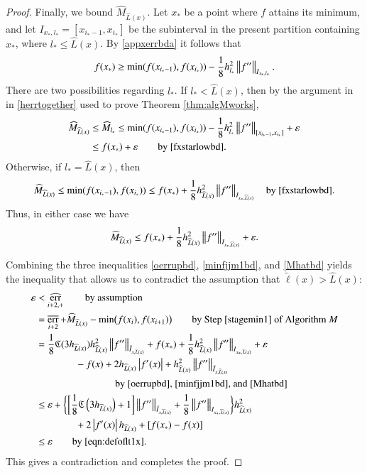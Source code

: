 \documentclass[review]{elsarticle}
\newcommand{\abstol}{\varepsilon}
\theoremstyle{definition}
\newcommand{\tell}{\tilde{\ell}}
\newcommand{\chL}{\widehat{L}}
\newcommand{\hM}{\widehat{M}}
\DeclareMathOperator{\oerr}{\overline{err}}
\DeclareMathOperator{\herr}{\widehat{err}}
\begin{document}
\begin{proof}
Finally, we bound $ \hM_{\chL(x)}$. Let $x_*$ be a point where $f$ attains its minimum,
and
let $I_{x_*,l_*} = [x_{i_*-1}, x_{i_*}]$ be the subinterval in the present partition containing
$x_*$, where $l_* \le \chL(x)$. By
\eqref{appxerrbda} it follows that
\begin{equation} \label{fxstarlowbd}
f(x_*) \ge \min(f(x_{i_*-1}),f(x_{i_*})) - \frac18 h_{l_*}^2\norm[I_{x_*,l_*}]{f''}.
\end{equation}
There are two possibilities regarding $l_*$. If $l_* < \chL(x)$, then by the argument in  in
\eqref{herrtogether} used to prove Theorem \ref{thm:algMworks},
\begin{align*}
\hM_{\chL(x)}   & \le \hM_{l_*}
\le \min(f(x_{i_*-1}),f(x_{i_*})) - \frac18 h_{l_*}^2 \norm[{[x_{i_*-1}, x_{i_*}]}]{f''}  + \abstol  \\
& \le  f(x_*) + \abstol \qquad \text{by}~\eqref{fxstarlowbd} .
\end{align*}
Otherwise, if $l_* = \chL(x)$, then
\begin{equation*}
\hM_{\chL(x)}   \le \min(f(x_{i_*-1}),f(x_{i_*}))  \le  f(x_*) + \frac18 h_{\chL(x)}^2
\norm[{I_{x_*,\chL(x)}}]{f''} \quad \text{by}~\eqref{fxstarlowbd} .
\end{equation*}
Thus, in either case we have
\begin{equation} \label{Mhatbd}
\hM_{\chL(x)} \le f(x_*) + \frac 18 h_{\chL(x)}^2  \norm[{I_{x_*,\chL(x)}}]{f''} + \abstol.
\end{equation}

Combining the three inequalities \eqref{oerrupbd}, \eqref{minfjjm1bd}, and
\eqref{Mhatbd} yields the inequality that allows us to contradict the assumption
that $\tell(x) > \chL(x)$:
\begin{align*}
\abstol & < \herr_{i+2,+} \qquad \text{by assumption} \\
& = \oerr_{i+2} + \hM_{\chL(x)} - \min\bigl(f(x_{i}),f(x_{i+1})\bigr) \qquad \text{by Step
\ref{stagemin1} of Algorithm $M$} \\
& = \frac{1}{8} \fC(3 h_{\chL(x)}) h_{\chL(x)}^2 \norm[\tilde{I}_{x,\chL(x)}]{f''} + f(x_*) +
\frac 18 h_{\chL(x)}^2  \norm[{I_{x_*,\chL(x)}}]{f''} + \abstol \\
& \qquad \qquad - f(x) + 2h_{\chL(x)}\abs{f'(x)} + h_{\chL(x)}^2
\norm[\bar{I}_{x,\chL(x)}]{f''} \\
&  \qquad \qquad \qquad  \qquad \text{by \eqref{oerrupbd}, \eqref{minfjjm1bd}, and
\eqref{Mhatbd}} \\
& \le \abstol + \biggl\{ \biggl[\frac 18 \fC\left(3 h_{\chL(x)} \right) + 1 \biggr]
\norm[\tilde{I}_{x,\chL(x)}]{f''} + \frac18\norm[{I_{x_*,\chL(x)}}]{f''} \biggr\} h_{\chL(x)}^2 \\
& \qquad \qquad +  2 \abs{f'(x)} h_{\chL(x)} + [f(x_*) - f(x)] \\
& \le \abstol \qquad \text{by \eqref{eqn:defoflt1x}}.
\end{align*}
This gives a contradiction and completes the proof.
\end{proof}
\end{document}
